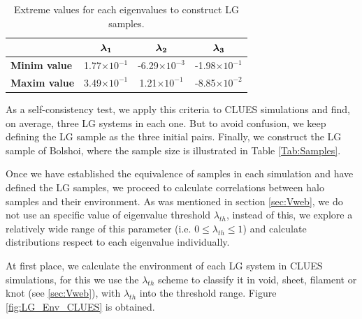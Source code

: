 \documentclass[usenatbib]{latex/mn2e}
\begin{document}
\begin{table}
  \centering
  \begin{tabular}{l | c c c} \hline
	& $\boldsymbol{ \lambda_{1} }$ & $\boldsymbol{ \lambda_{2} }$  & $\boldsymbol{ \lambda_{3} }$ \\ \hline
	\textbf{Minim value} & 1.77$\times 10^{-1}$ & -6.29$\times 10^{-3}$ & -1.98$\times 10^{-1}$ \\
	\textbf{Maxim value} & 3.49$\times 10^{-1}$ & 1.21$\times 10^{-1}$ & -8.85$\times 10^{-2}$ \\ \hline
  \end{tabular}
  
  \caption{Extreme values for each eigenvalues to construct LG samples.}
  
  \label{Tab:Lambdas_LG}
\end{table}


As a self-consistency test, we apply this criteria to CLUES simulations 
and find, on average, three LG systems in each one. But to avoid confusion, 
we keep defining the LG sample as the three initial pairs. Finally, we 
construct the LG sample of Bolshoi, where the sample size is illustrated 
in Table \ref{Tab:Samples}.




Once we have established the equivalence of samples in each simulation and 
have defined the LG samples, we proceed to calculate correlations between 
halo samples and their environment. As was mentioned in section 
\ref{sec:Vweb}, we do not use an specific value of eigenvalue threshold 
$\lambda_{th}$, instead of this, we explore a relatively wide range of 
this parameter (i.e. $0 \leq \lambda_{th} \leq 1$) and calculate 
distributions respect to each eigenvalue individually.


At first place, we calculate the environment of each LG system in CLUES 
simulations, for this we use the $\lambda_{th}$ scheme to classify it in 
void, sheet, filament or knot (see \ref{sec:Vweb}), with $\lambda_{th}$
into the threshold range. Figure \ref{fig:LG_Env_CLUES} is obtained.
\end{document}

